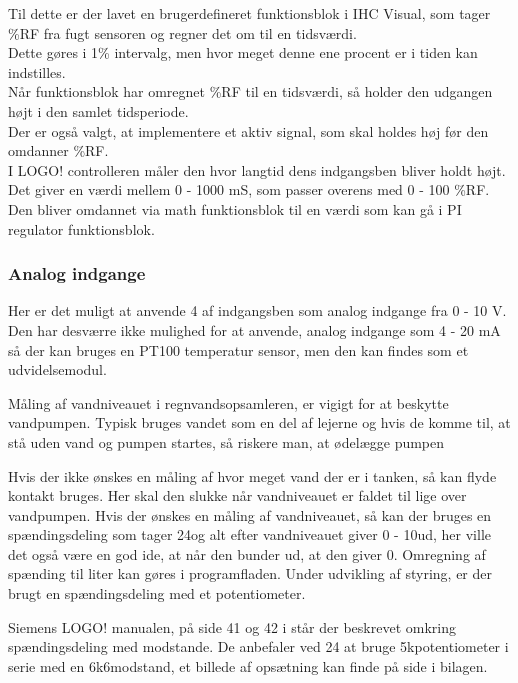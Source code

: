 Til dette er der lavet en brugerdefineret funktionsblok i IHC Visual, 
som tager \%RF fra fugt sensoren og regner det om til en tidsværdi. \\ 
Dette gøres i 1\% intervalg, men hvor meget denne ene procent er i tiden kan indstilles. \\
Når funktionsblok har omregnet \%RF til en tidsværdi, så holder den udgangen højt i den samlet tidsperiode. \\
Der er også valgt, at implementere et aktiv signal, som skal holdes høj før den omdanner \%RF.\\

I LOGO! controlleren måler den hvor langtid dens indgangsben bliver holdt højt.
Det giver en værdi mellem 0 - 1000 mS, som passer overens med 0 - 100 \%RF. Den bliver omdannet via math funktionsblok til en værdi som kan gå i PI regulator funktionsblok.

\subsubsection{Analog indgange}
Her er det muligt at anvende 4 af indgangsben som analog indgange fra 0 - 10 V.
Den har desværre ikke mulighed for at anvende, 
analog indgange som 4 - 20 mA så der kan bruges en PT100 temperatur sensor,
men den kan findes som et udvidelsemodul.

Måling af vandniveauet i regnvandsopsamleren, er vigigt for at beskytte vandpumpen. 
Typisk bruges vandet som en del af lejerne og hvis de komme til, 
at stå uden vand og pumpen startes, 
så riskere man, at ødelægge pumpen

Hvis der ikke ønskes en måling af hvor meget vand der er i tanken, så kan flyde kontakt bruges.
Her skal den slukke når vandniveauet er faldet til lige over vandpumpen.
Hvis der ønskes en måling af vandniveauet, så kan der bruges en spændingsdeling som tager 24\vdc og alt efter vandniveauet giver 0 - 10\vdc ud,
her ville det også være en god ide, at når den bunder ud, at den giver 0\vdc. Omregning af spænding til liter kan gøres i programfladen. 
Under udvikling af styring, er der brugt en spændingsdeling med et potentiometer.

Siemens LOGO! manualen, på side 41 og 42 i \cite{logo_sm} står der beskrevet omkring spændingsdeling med modstande. 
De anbefaler ved 24 \vdc at bruge 5k\ohm potentiometer i serie med en 6k6\ohm modstand, 
et billede af opsætning kan finde på side \pageref{man:logo_side_42} i bilagen.

